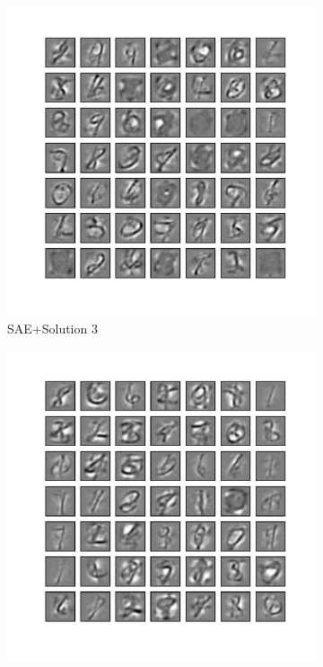 \begin{figure}
\begin{subfigure}[t]{0.4\textwidth}
	\end{subfigure}\\
	\begin{subfigure}[t]{0.4\textwidth}
		\includegraphics[width=\textwidth]{pics_sdlm/41_MNIST_SAE_teach/2_60000_0.pdf}
		\caption{SAE+Solution 3}
	\end{subfigure}
	\begin{subfigure}[t]{0.4\textwidth}
		\includegraphics[width=\textwidth]{pics_sdlm/43_MNIST_SAE_all/2_60000_0.pdf}

\end{subfigure}
\end{figure}
